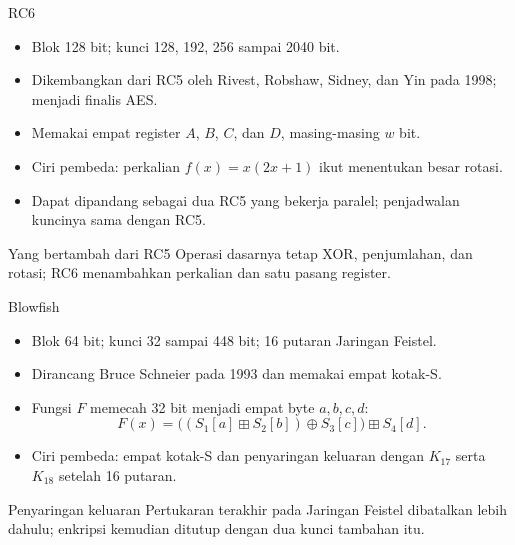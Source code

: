 \documentclass[aspectratio=169,11pt]{beamer}
\begin{document}
\begin{frame}{RC6}
    \footnotesize
    \begin{itemize}
        \item Blok 128 bit; kunci 128, 192, 256 sampai 2040 bit.
        \item Dikembangkan dari RC5 oleh Rivest, Robshaw, Sidney, dan Yin
              pada 1998; menjadi finalis AES.
        \item Memakai empat register $A$, $B$, $C$, dan $D$, masing-masing
              $w$ bit.
        \item Ciri pembeda: perkalian $f(x) = x(2x+1)$ ikut menentukan
              besar rotasi.
        \item Dapat dipandang sebagai dua RC5 yang bekerja paralel;
              penjadwalan kuncinya sama dengan RC5.
    \end{itemize}
    \vspace{0.1cm}
    \begin{exampleblock}{Yang bertambah dari RC5}
        \footnotesize
        Operasi dasarnya tetap XOR, penjumlahan, dan rotasi; RC6
        menambahkan perkalian dan satu pasang register.
    \end{exampleblock}
\end{frame}

\begin{frame}{Blowfish}
    \footnotesize
    \begin{itemize}
        \item Blok 64 bit; kunci 32 sampai 448 bit; 16 putaran Jaringan
              Feistel.
        \item Dirancang Bruce Schneier pada 1993 dan memakai empat kotak-S.
        \item Fungsi $F$ memecah 32 bit menjadi empat byte $a,b,c,d$:
              \[
                  F(x) = \bigl((S_1[a] \boxplus S_2[b]) \oplus S_3[c]\bigr)
                  \boxplus S_4[d].
              \]
        \item Ciri pembeda: empat kotak-S dan penyaringan keluaran dengan
              $K_{17}$ serta $K_{18}$ setelah 16 putaran.
    \end{itemize}
    \vspace{0.05cm}
    \begin{alertblock}{Penyaringan keluaran}
        \footnotesize
        Pertukaran terakhir pada Jaringan Feistel dibatalkan lebih dahulu;
        enkripsi kemudian ditutup dengan dua kunci tambahan itu.
    \end{alertblock}
\end{frame}
\end{document}
